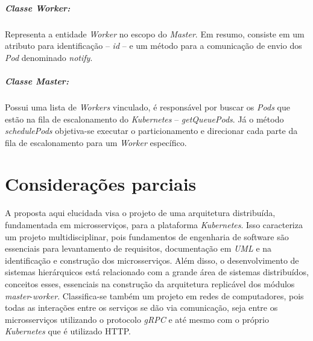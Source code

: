 \subparagraph{Classe \textit{Worker}:}
Representa a entidade \textit{Worker} no escopo do \textit{Master}. Em resumo, consiste em um atributo para identificação -- \textit{id} -- e um método para a comunicação de envio dos \textit{Pod} denominado \textit{notify}.

\subparagraph{Classe \textit{Master}:}
Possui uma lista de \textit{Workers} vinculado, é responsável por buscar os \textit{Pods} que estão na fila de escalonamento do \textit{Kubernetes} -- \textit{getQueuePods}. Já o método \textit{schedulePods} objetiva-se executar o particionamento e direcionar cada parte da fila de escalonamento para um \textit{Worker} específico.

\section{Considerações parciais}

A proposta aqui elucidada visa o projeto de uma arquitetura distribuída, fundamentada em microsserviços, para a plataforma \textit{Kubernetes}. Isso caracteriza um projeto multidisciplinar, pois fundamentos de engenharia de software são essenciais para levantamento de requisitos, documentação em \textit{UML} e na identificação e construção dos microsserviços. Além disso, o desenvolvimento de sistemas hierárquicos está relacionado com a grande área de sistemas distribuídos, conceitos esses, essenciais na construção da arquitetura replicável dos módulos \textit{master}-\textit{worker}. Classifica-se também um projeto em redes de computadores, pois todas as interações entre os serviços se dão via comunicação, seja entre os microsserviços utilizando o protocolo \textit{gRPC} e até mesmo com o próprio \textit{Kubernetes} que é utilizado \ac{HTTP}.





